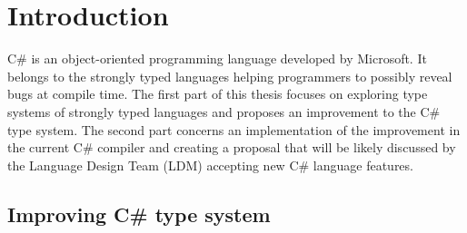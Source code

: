 \chapter{Introduction}


C\# is an object-oriented programming language developed by Microsoft. 
It belongs to the strongly typed languages helping programmers to possibly reveal bugs at compile time. 
The first part of this thesis focuses on exploring type systems of strongly typed languages and proposes an improvement to the C\# type system. 
The second part concerns an implementation of the improvement in the current C\# compiler and creating a proposal that will be likely discussed by the Language Design Team (LDM) accepting new C\# language features.

\section{Improving C\# type system}

